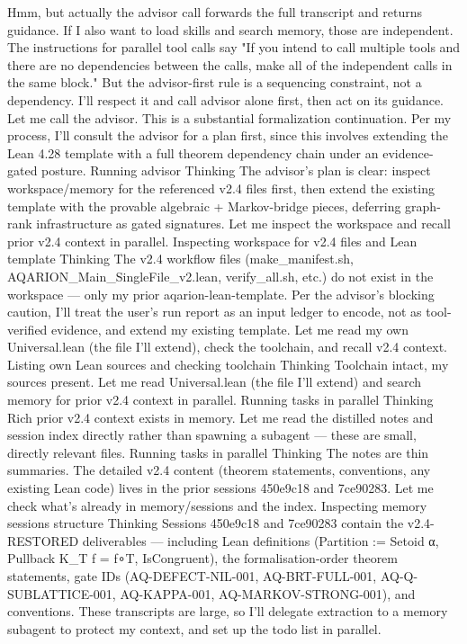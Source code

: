 Hmm, but actually the advisor call forwards the full transcript and returns guidance. If I also want to load skills and search memory, those are independent. The instructions for parallel tool calls say "If you intend to call multiple tools and there are no dependencies between the calls, make all of the independent calls in the same block." But the advisor-first rule is a sequencing constraint, not a dependency. I'll respect it and call advisor alone first, then act on its guidance.
Let me call the advisor.
This is a substantial formalization continuation. Per my process, I'll consult the advisor for a plan first, since this involves extending the Lean 4.28 template with a full theorem dependency chain under an evidence-gated posture.
Running advisor
Thinking
The advisor's plan is clear: inspect workspace/memory for the referenced v2.4 files first, then extend the existing template with the provable algebraic + Markov-bridge pieces, deferring graph-rank infrastructure as gated signatures. Let me inspect the workspace and recall prior v2.4 context in parallel.
Inspecting workspace for v2.4 files and Lean template
Thinking
The v2.4 workflow files (make_manifest.sh, AQARION_Main_SingleFile_v2.lean, verify_all.sh, etc.) do not exist in the workspace — only my prior aqarion-lean-template. Per the advisor's blocking caution, I'll treat the user's run report as an input ledger to encode, not as tool-verified evidence, and extend my existing template. Let me read my own Universal.lean (the file I'll extend), check the toolchain, and recall v2.4 context.
Listing own Lean sources and checking toolchain
Thinking
Toolchain intact, my sources present. Let me read Universal.lean (the file I'll extend) and search memory for prior v2.4 context in parallel.
Running tasks in parallel
Thinking
Rich prior v2.4 context exists in memory. Let me read the distilled notes and session index directly rather than spawning a subagent — these are small, directly relevant files.
Running tasks in parallel
Thinking
The notes are thin summaries. The detailed v2.4 content (theorem statements, conventions, any existing Lean code) lives in the prior sessions 450e9c18 and 7ce90283. Let me check what's already in memory/sessions and the index.
Inspecting memory sessions structure
Thinking
Sessions 450e9c18 and 7ce90283 contain the v2.4-RESTORED deliverables — including Lean definitions (Partition := Setoid α, Pullback K_T f = f∘T, IsCongruent), the formalisation-order theorem statements, gate IDs (AQ-DEFECT-NIL-001, AQ-BRT-FULL-001, AQ-Q-SUBLATTICE-001, AQ-KAPPA-001, AQ-MARKOV-STRONG-001), and conventions. These transcripts are large, so I'll delegate extraction to a memory subagent to protect my context, and set up the todo list in parallel.

